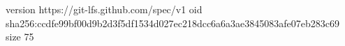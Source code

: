 version https://git-lfs.github.com/spec/v1
oid sha256:ccdfe99bf00d9b2d3f5df1534d027ec218dcc6a6a3ae3845083afe07eb283c69
size 75
